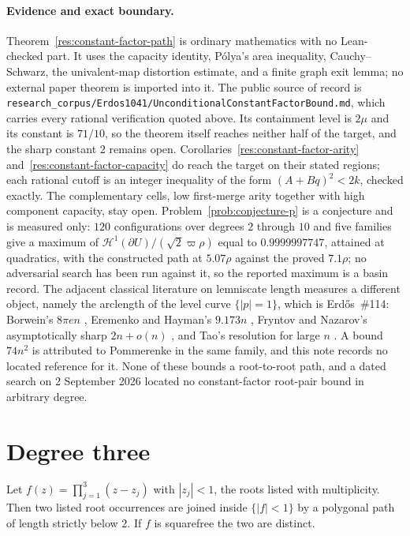 \paragraph{Evidence and exact boundary.}
\label{bdry:constant-factor}
Theorem~\ref{res:constant-factor-path} is ordinary mathematics with no
Lean-checked part.  It uses the capacity identity, P\'olya's area inequality,
Cauchy--Schwarz, the univalent-map distortion estimate, and a finite graph
exit lemma; no external paper theorem is imported into it.  The public source
of record is
\texttt{research\_corpus/Erdos1041/UnconditionalConstantFactorBound.md}, which
carries every rational verification quoted above.  Its
containment level is $2\mu$ and its constant is $71/10$, so the theorem itself
reaches neither half of the target, and the sharp constant $2$ remains open.
Corollaries~\ref{res:constant-factor-arity} and~\ref{res:constant-factor-capacity}
do reach the target on their stated regions; each rational cutoff is an integer
inequality of the form $(A+Bq)^2<2k$, checked exactly.  The complementary
cells, low first-merge arity together with high component capacity, stay open.
Problem~\ref{prob:conjecture-p} is a conjecture and is measured only: $120$
configurations over degrees $2$ through $10$ and five families give a maximum
of $\mathcal H^1(\partial U)/(\sqrt2\varpi\rho)$ equal to $0.9999997747$,
attained at quadratics, with the constructed path at $5.07\rho$ against the
proved $7.1\rho$; no adversarial search has been run against it, so the
reported maximum is a basin record.  The
adjacent classical literature on lemniscate length measures a different
object, namely the arclength of the level curve $\{|p|=1\}$, which is
Erd\H{o}s~\#114: Borwein's $8\pi en$
\cite{borwein1995}, Eremenko and Hayman's $9.173n$ \cite{eremenkohayman1999},
Fryntov and Nazarov's asymptotically sharp $2n+o(n)$ \cite{fryntovnazarov2008},
and Tao's resolution for large $n$ \cite{tao2025}.  A bound $74n^2$ is
attributed to Pommerenke in the same family, and this note records no located
reference for it.  None of these bounds a
root-to-root path, and a dated search on 2 September 2026 located no
constant-factor root-pair bound in arbitrary degree.

\section{Degree three}
\label{sec:degree-three}

\begin{theorem}
\label{res:degree-three}
Let $f(z)=\prod_{j=1}^{3}(z-z_j)$ with $|z_j|<1$, the roots listed with
multiplicity.  Then two listed root occurrences are joined inside
$\{|f|<1\}$ by a polygonal path of length strictly below $2$.  If $f$ is
squarefree the two are distinct.
\end{theorem}

